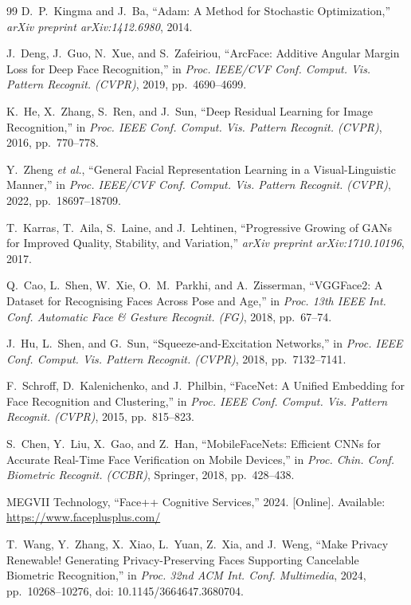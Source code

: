 \documentclass[oneside,a4paper,12pt]{extarticle}
\begin{document}
\begin{thebibliography}{99}
D.~P.~Kingma and J.~Ba, ``Adam: A Method for Stochastic Optimization,'' \textit{arXiv preprint arXiv:1412.6980}, 2014.

J.~Deng, J.~Guo, N.~Xue, and S.~Zafeiriou, ``ArcFace: Additive Angular Margin Loss for Deep Face Recognition,'' in \textit{Proc. IEEE/CVF Conf. Comput. Vis. Pattern Recognit. (CVPR)}, 2019, pp.~4690--4699.

K.~He, X.~Zhang, S.~Ren, and J.~Sun, ``Deep Residual Learning for Image Recognition,'' in \textit{Proc. IEEE Conf. Comput. Vis. Pattern Recognit. (CVPR)}, 2016, pp.~770--778.

Y.~Zheng \textit{et al.}, ``General Facial Representation Learning in a Visual-Linguistic Manner,'' in \textit{Proc. IEEE/CVF Conf. Comput. Vis. Pattern Recognit. (CVPR)}, 2022, pp.~18697--18709.

T.~Karras, T.~Aila, S.~Laine, and J.~Lehtinen, ``Progressive Growing of GANs for Improved Quality, Stability, and Variation,'' \textit{arXiv preprint arXiv:1710.10196}, 2017.

Q.~Cao, L.~Shen, W.~Xie, O.~M.~Parkhi, and A.~Zisserman, ``VGGFace2: A Dataset for Recognising Faces Across Pose and Age,'' in \textit{Proc. 13th IEEE Int. Conf. Automatic Face \& Gesture Recognit. (FG)}, 2018, pp.~67--74.

J.~Hu, L.~Shen, and G.~Sun, ``Squeeze-and-Excitation Networks,'' in \textit{Proc. IEEE Conf. Comput. Vis. Pattern Recognit. (CVPR)}, 2018, pp.~7132--7141.

F.~Schroff, D.~Kalenichenko, and J.~Philbin, ``FaceNet: A Unified Embedding for Face Recognition and Clustering,'' in \textit{Proc. IEEE Conf. Comput. Vis. Pattern Recognit. (CVPR)}, 2015, pp.~815--823.

S.~Chen, Y.~Liu, X.~Gao, and Z.~Han, ``MobileFaceNets: Efficient CNNs for Accurate Real-Time Face Verification on Mobile Devices,'' in \textit{Proc. Chin. Conf. Biometric Recognit. (CCBR)}, Springer, 2018, pp.~428--438.

MEGVII Technology, ``Face++ Cognitive Services,'' 2024. [Online]. Available: \url{https://www.faceplusplus.com/}

T.~Wang, Y.~Zhang, X.~Xiao, L.~Yuan, Z.~Xia, and J.~Weng, ``Make Privacy Renewable! Generating Privacy-Preserving Faces Supporting Cancelable Biometric Recognition,'' in \textit{Proc. 32nd ACM Int. Conf. Multimedia}, 2024, pp.~10268--10276, doi: 10.1145/3664647.3680704.


\end{thebibliography}
\end{document}
